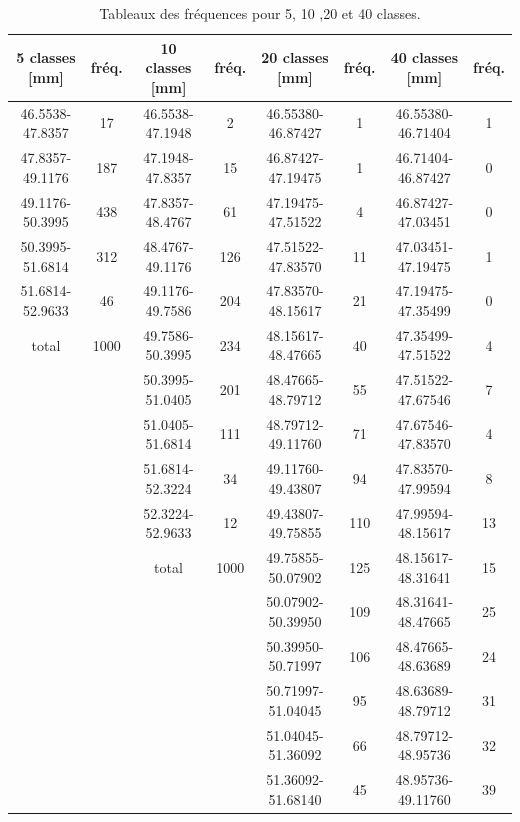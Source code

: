 \begin{table}[p]
\footnotesize
\caption{Tableaux des fréquences pour 5, 10 ,20 et 40 classes.}
\begin{center}
\begin{tabular}{cccccccc}
5 classes [mm] & fréq. & 10 classes [mm] & fréq. & 20 classes [mm] & fréq. & 40 classes [mm] & fréq. \\\hline
46.5538-47.8357 &  17 & 46.5538-47.1948 &   2 & 46.55380-46.87427 &   1 & 46.55380-46.71404 &  1 \\
47.8357-49.1176 & 187 & 47.1948-47.8357 &  15 & 46.87427-47.19475 &   1 & 46.71404-46.87427 &  0 \\
49.1176-50.3995 & 438 & 47.8357-48.4767 &  61 & 47.19475-47.51522 &   4 & 46.87427-47.03451 &  0 \\
50.3995-51.6814 & 312 & 48.4767-49.1176 & 126 & 47.51522-47.83570 &  11 & 47.03451-47.19475 &  1 \\
51.6814-52.9633 &  46 & 49.1176-49.7586 & 204 & 47.83570-48.15617 &  21 & 47.19475-47.35499 &  0 \\
         total & 1000 & 49.7586-50.3995 & 234 & 48.15617-48.47665 &  40 & 47.35499-47.51522 &  4 \\
                    & & 50.3995-51.0405 & 201 & 48.47665-48.79712 &  55 & 47.51522-47.67546 &  7 \\
                    & & 51.0405-51.6814 & 111 & 48.79712-49.11760 &  71 & 47.67546-47.83570 &  4 \\
                    & & 51.6814-52.3224 &  34 & 49.11760-49.43807 &  94 & 47.83570-47.99594 &  8 \\
                    & & 52.3224-52.9633 &  12 & 49.43807-49.75855 & 110 & 47.99594-48.15617 & 13 \\
                             & & total & 1000 & 49.75855-50.07902 & 125 & 48.15617-48.31641 & 15 \\
                                        & & & & 50.07902-50.39950 & 109 & 48.31641-48.47665 & 25 \\
                                        & & & & 50.39950-50.71997 & 106 & 48.47665-48.63689 & 24 \\
                                        & & & & 50.71997-51.04045 &  95 & 48.63689-48.79712 & 31 \\
                                        & & & & 51.04045-51.36092 &  66 & 48.79712-48.95736 & 32 \\
                                        & & & & 51.36092-51.68140 &  45 & 48.95736-49.11760 & 39 \\

\end{tabular}
\end{center}
\end{table}
